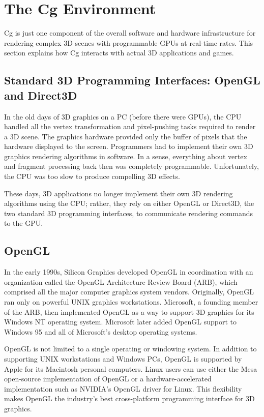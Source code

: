 \documentclass{book}
\begin{document}
\section{The Cg Environment}

Cg is just one component of the overall software and hardware infrastructure for rendering complex 3D scenes with programmable GPUs at real-time rates. This section explains how Cg interacts with actual 3D applications and games.

\subsection{Standard 3D Programming Interfaces: OpenGL and Direct3D}

In the old days of 3D graphics on a PC (before there were GPUs), the CPU handled all the vertex transformation and pixel-pushing tasks required to render a 3D scene. The graphics hardware provided only the buffer of pixels that the hardware displayed to the screen. Programmers had to implement their own 3D graphics rendering algorithms in software. In a sense, everything about vertex and fragment processing back then was completely programmable. Unfortunately, the CPU was too slow to produce compelling 3D effects.

These days, 3D applications no longer implement their own 3D rendering algorithms using the CPU; rather, they rely on either OpenGL or Direct3D, the two standard 3D programming interfaces, to communicate rendering commands to the GPU.

\subsection*{OpenGL}
In the early 1990s, Silicon Graphics developed OpenGL in coordination with an organization called the OpenGL Architecture Review Board (ARB), which comprised all the major computer graphics system vendors. Originally, OpenGL ran only on powerful UNIX graphics workstations. Microsoft, a founding member of the ARB, then implemented OpenGL as a way to support 3D graphics for its Windows NT operating system. Microsoft later added OpenGL support to Windows 95 and all of Microsoft's desktop operating systems.

OpenGL is not limited to a single operating or windowing system. In addition to supporting UNIX workstations and Windows PCs, OpenGL is supported by Apple for its Macintosh personal computers. Linux users can use either the Mesa open-source implementation of OpenGL or a hardware-accelerated implementation such as NVIDIA's OpenGL driver for Linux. This flexibility makes OpenGL the industry's best cross-platform programming interface for 3D graphics.
\end{document}
